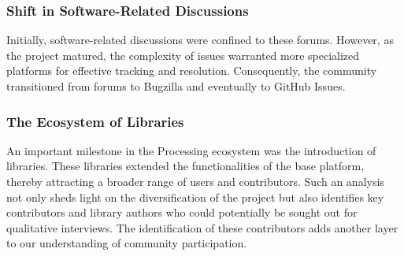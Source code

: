 \documentclass[draft]{article}
\begin{document}
\subsubsection*{Shift in Software-Related Discussions}

Initially, software-related discussions were confined to these forums. However, as the project matured, the complexity of issues warranted more specialized platforms for effective tracking and resolution. Consequently, the community transitioned from forums to Bugzilla \parencite{BugzillaArchiveProcessing} and eventually to GitHub Issues\parencite{ProcessingProcessingSource}\parencite{ProcessingProcessing4Processing}. 

\subsubsection*{The Ecosystem of Libraries}
An important milestone in the Processing ecosystem was the introduction of libraries. These libraries extended the functionalities of the base platform, thereby attracting a broader range of users and contributors. Such an analysis not only sheds light on the diversification of the project but also identifies key contributors and library authors who could potentially be sought out for qualitative interviews. The identification of these contributors adds another layer to our understanding of community participation.











\end{document}
